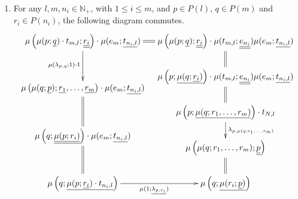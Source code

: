 \begin{Defi}
\begin{enumerate}
\[                (60,-60)*+{\mu\left(r;\underline{\mu(p;q_1,\ldots,q_n)}\right)}="13";
                (0,-60)*+{\mu\left(\mu(r;\underline{p});\underline{q_1,\ldots,q_n}\right)}="04";
                {\ar@{=} "00" ; "10"};
                {\ar@{=} "00" ; "01"};
                {\ar@{=} "10" ; "11"};
                {\ar_{\mu(1;\underline{\lambda_{q_i,r}}) \cdot 1} "01" ; "02"};
                {\ar@{=} "02" ; "03"};
                {\ar@{=} "04" ; "13"};
                {\ar_{\mu(\lambda_{p,r};1)} "03" ; "04"};
                {\ar^{\lambda_{\mu(p;q_1,\ldots,q_n),r}} "11" ; "12"};
                {\ar@{=} "12" ; "13"};
            \endxy
          \]
        \item\label{axiom:t_diagL} For any $l,m, n_i \in \mathbb{N}_+$, with $1 \leq i \leq m$, and $p \in P(l)$, $q \in P(m)$ and $r_i \in P(n_i)$, the following diagram commutes.
          \[
            \xy
                (0,0)*+{\mu\left(\mu(p;\underline{q}) \cdot t_{m,l} ; \underline{\underline{r_i}}\right) \cdot \mu(e_m;\underline{t_{n_i,l}})}="00";
                (60,0)*+{\mu\left(\mu(p;\underline{q});\underline{\underline{r_i}}\right) \cdot \mu(t_{m,l};\underline{\underline{e_{n_i}}})\mu(e_{m};\underline{t_{n_i,l}})}="10";
                (60,-15)*+{\mu\left(p;\underline{\mu(q;\underline{r_i})}\right) \cdot \mu(t_{m,l};\underline{\underline{e_{n_i}}})\mu(e_{m};\underline{t_{n_i,l}})}="11";
                (0,-20)*+{\mu\left(\mu(q;\underline{p}); \underline{r_1},\ldots,\underline{r_m}\right) \cdot \mu(e_m;\underline{t_{n_i,l}})}="01";
                (0,-40)*+{\mu\left(q;\underline{\underline{\mu(p;r_i)}}\right) \cdot \mu(e_m;\underline{t_{n_i,l}})}="02";
                (0,-60)*+{\mu\left(q;\underline{\mu(p;\underline{r_i}) \cdot t_{n_i,l}}\right)}="03";
                (60,-30)*+{\mu\left(p;\underline{\mu(q;r_1,\ldots,r_m)}\right) \cdot t_{N,l}}="12";
                (60,-45)*+{\mu\left(\mu(q;r_1,\ldots,r_m); \underline{\underline{p}}\right)}="13";
                (60,-60)*+{\mu\left(q;\underline{\mu(r_i;\underline{p})}\right)}="14";
                {\ar@{=} "00" ; "10"};
                {\ar@{=} "10" ; "11"};
                {\ar@{=} "11" ; "12"};
                {\ar^{\lambda_{p,\mu(q;r_1,\ldots,r_m)}} "12" ; "13"};
                {\ar@{=} "13" ; "14"};
                {\ar_{\mu(\lambda_{p,q};1) \cdot 1} "00" ; "01"};
                {\ar@{=} "01" ; "02"};
                {\ar@{=} "02" ; "03"};
                {\ar_{\mu(1;\underline{\lambda_{p,r_i}})} "03" ; "14"};
            \endxy
          \]
    \end{enumerate}
\end{Defi}

